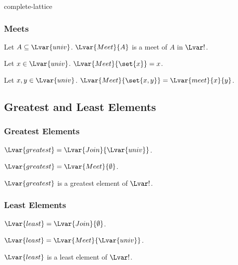 \documentclass{stex}
\begin{document}
\begin{smodule}{complete-lattice}
  \subsubsection{Meets}

  \begin{forthel}
    \begin{signature}
      Let $A\subseteq\Lvar{univ}$.
      $\Lvar{Meet}{A}$ is a meet of $A$ in $\Lvar!$.
    \end{signature}
    
    \begin{proposition}
      Let $x\in\Lvar{univ}$.
      $\Lvar{Meet}{\set{x}}=x$.
    \end{proposition}
    
    \begin{proposition}
      Let $x,y\in\Lvar{univ}$.
      $\Lvar{Meet}{\set{x,y}}=\Lvar{meet}{x}{y}$.
    \end{proposition}
  \end{forthel}

  \subsection{Greatest and Least Elements}

  \subsubsection{Greatest Elements}

  \begin{forthel}
    \begin{definition}
      $\Lvar{greatest}=\Lvar{Join}{\Lvar{univ}}$.
    \end{definition}

    \begin{proposition}
      $\Lvar{greatest}=\Lvar{Meet}{\emptyset}$.
    \end{proposition}

    \begin{proposition}
      $\Lvar{greatest}$ is a greatest element of $\Lvar!$.
    \end{proposition}
  \end{forthel}

  \subsubsection{Least Elements}

  \begin{forthel}
    \begin{definition}
      $\Lvar{least}=\Lvar{Join}{\emptyset}$.
    \end{definition}

    \begin{proposition}
      $\Lvar{least}=\Lvar{Meet}{\Lvar{univ}}$.
    \end{proposition}

    \begin{proposition}
      $\Lvar{least}$ is a least element of $\Lvar!$.
    \end{proposition}
  \end{forthel}
\end{smodule}
\end{document}

